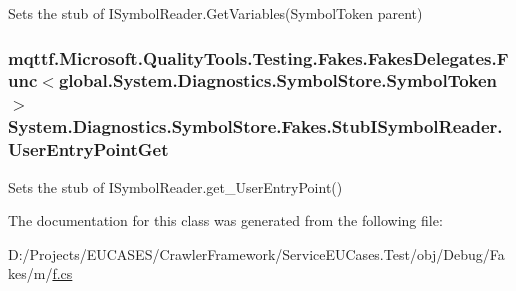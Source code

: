 Sets the stub of I\-Symbol\-Reader.\-Get\-Variables(\-Symbol\-Token parent)

\hypertarget{class_system_1_1_diagnostics_1_1_symbol_store_1_1_fakes_1_1_stub_i_symbol_reader_a15b7288967b7662c6b8540ba9e0da8ea}{
\subsubsection[{User\-Entry\-Point\-Get}]{\setlength{\rightskip}{0pt plus 5cm}mqttf.\-Microsoft.\-Quality\-Tools.\-Testing.\-Fakes.\-Fakes\-Delegates.\-Func$<$global.\-System.\-Diagnostics.\-Symbol\-Store.\-Symbol\-Token$>$ System.\-Diagnostics.\-Symbol\-Store.\-Fakes.\-Stub\-I\-Symbol\-Reader.\-User\-Entry\-Point\-Get}}\label{class_system_1_1_diagnostics_1_1_symbol_store_1_1_fakes_1_1_stub_i_symbol_reader_a15b7288967b7662c6b8540ba9e0da8ea}


Sets the stub of I\-Symbol\-Reader.\-get\-\_\-\-User\-Entry\-Point()



The documentation for this class was generated from the following file\-:\begin{DoxyCompactItemize}
\item 
D\-:/\-Projects/\-E\-U\-C\-A\-S\-E\-S/\-Crawler\-Framework/\-Service\-E\-U\-Cases.\-Test/obj/\-Debug/\-Fakes/m/\hyperlink{m_2f_8cs}{f.\-cs}\end{DoxyCompactItemize}
